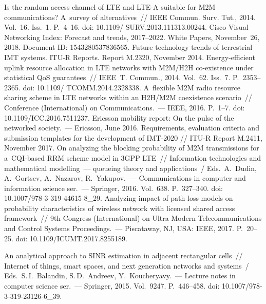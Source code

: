 \begin{multicols}{2}
{\small\frenchspacing
 {%
 \begin{thebibliography}{99}
 Is the random access channel of LTE and LTE-A 
suitable for M2M communications? A~survey of alternatives~// IEEE Commun. Surv. 
Tut., 2014. Vol.~16. Iss.~1. P.~4--16. doi: 10.1109/ SURV.2013.111313.00244.
Cisco Visual Networking Index: Forecast and trends, 2017--2022. White Papers, 
November~26, 2018. Document ID: 1543280537836565.
Future technology trends of terrestrial IMT systems. \mbox{ITU-R} Reports. Report M.2320,
November 2014.
 Energy-efficient uplink 
resource allocation in LTE networks with M2M/H2H co-existence under statistical QoS 
guarantees~// IEEE~T. Commun., 2014. Vol.~62. Iss.~7. P.~2353--2365. doi: 
10.1109/ TCOMM.2014.2328338.
 A~flexible M2M radio resource sharing 
scheme in LTE networks within an H2H/M2M coexistence scenario~// Conference (International) 
on Communications.~--- IEEE, 2016. P.~1--7. doi: 10.1109/ICC.2016.7511237.
Ericsson mobility report: On the pulse of the networked society.~--- Ericsson, June 2016.
Requirements, evaluation criteria and submission templates for the development of IMT-2020 // 
ITU-R Report M.2411, November 2017.
 On analyzing the blocking probability 
of M2M transmissions for a~CQI-based RRM scheme model in 3GPP LTE~// Information 
technologies and mathematical modelling~--- queueing theory and applications~/
Eds.\ A.~Dudin, A.~Gortsev, A.~Nazarov, R.~Yakupov.~---
Communications in computer and information science ser.~---
Springer, 2016. Vol.~638. P.~327--340. doi: 
10.1007/978-3-319-44615-8\_29.
 Analyzing impact of path loss models on 
probability characteristics of wireless network with licensed shared access framework~//  9th 
Congress (International) on Ultra Modern Telecommunications and Control Systems  
Proceedings.~--- Piscataway, NJ, USA: IEEE, 2017. 
P.~20--25. doi: 10.1109/ICUMT.2017.8255189.

 An analytical approach to SINR estimation in adjacent rectangular cells~// Internet of 
things, smart spaces, and next generation networks and systems~/
Eds.\ S.\,I.~Balandin, S.\,D.~Andreev, Y.~Koucheryavy.~---
Lecture notes in computer  science ser.~--- Springer, 2015. Vol.~9247. 
P.~446--458. doi: 10.1007/978-3-319-23126-6\_39.


\end{thebibliography}}}
\end{multicols}
